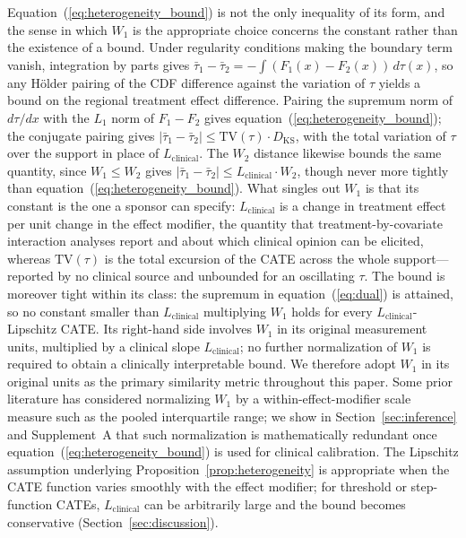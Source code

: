 \documentclass[AMA,Times1COL]{WileyNJDv5}
\begin{document}
\noindent Equation~(\ref{eq:heterogeneity_bound}) is not the only inequality of its form, and the sense in which $W_1$ is the appropriate choice concerns the constant rather than the existence of a bound. Under regularity conditions making the boundary term vanish, integration by parts gives $\bar{\tau}_1 - \bar{\tau}_2 = -\int (F_1(x) - F_2(x)) \, d\tau(x)$, so any H\"{o}lder pairing of the CDF difference against the variation of $\tau$ yields a bound on the regional treatment effect difference. Pairing the supremum norm of $d\tau/dx$ with the $L_1$ norm of $F_1 - F_2$ gives equation~(\ref{eq:heterogeneity_bound}); the conjugate pairing gives $|\bar{\tau}_1 - \bar{\tau}_2| \leq \mathrm{TV}(\tau) \cdot D_{\text{KS}}$, with the total variation of $\tau$ over the support in place of $L_{\text{clinical}}$. The $W_2$ distance likewise bounds the same quantity, since $W_1 \leq W_2$ gives $|\bar{\tau}_1 - \bar{\tau}_2| \leq L_{\text{clinical}} \cdot W_2$, though never more tightly than equation~(\ref{eq:heterogeneity_bound}).\cite{gibbs2002} What singles out $W_1$ is that its constant is the one a sponsor can specify: $L_{\text{clinical}}$ is a change in treatment effect per unit change in the effect modifier, the quantity that treatment-by-covariate interaction analyses report and about which clinical opinion can be elicited, whereas $\mathrm{TV}(\tau)$ is the total excursion of the CATE across the whole support---reported by no clinical source and unbounded for an oscillating $\tau$. The bound is moreover tight within its class: the supremum in equation~(\ref{eq:dual}) is attained, so no constant smaller than $L_{\text{clinical}}$ multiplying $W_1$ holds for every $L_{\text{clinical}}$-Lipschitz CATE. Its right-hand side involves $W_1$ in its original measurement units, multiplied by a clinical slope $L_{\text{clinical}}$; no further normalization of $W_1$ is required to obtain a clinically interpretable bound. We therefore adopt $W_1$ in its original units as the primary similarity metric throughout this paper. Some prior literature has considered normalizing $W_1$ by a within-effect-modifier scale measure such as the pooled interquartile range; we show in Section~\ref{sec:inference} and Supplement~A that such normalization is mathematically redundant once equation~(\ref{eq:heterogeneity_bound}) is used for clinical calibration. The Lipschitz assumption underlying Proposition~\ref{prop:heterogeneity} is appropriate when the CATE function varies smoothly with the effect modifier; for threshold or step-function CATEs, $L_{\text{clinical}}$ can be arbitrarily large and the bound becomes conservative (Section~\ref{sec:discussion}).
\end{document}
